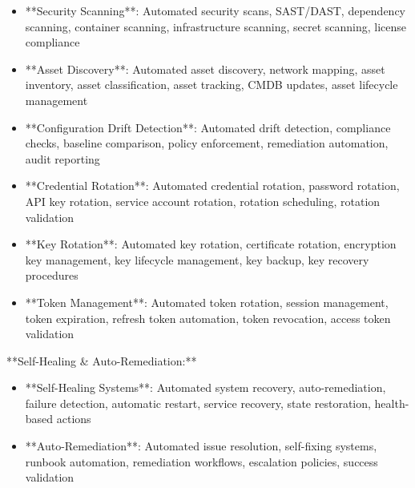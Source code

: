 \documentclass[11pt,a4paper]{article}
\begin{document}
\begin{itemize}
\item **Security Scanning**: Automated security scans, SAST/DAST, dependency scanning, container scanning, infrastructure scanning, secret scanning, license compliance
\end{itemize}

\begin{itemize}
\item **Asset Discovery**: Automated asset discovery, network mapping, asset inventory, asset classification, asset tracking, CMDB updates, asset lifecycle management
\end{itemize}

\begin{itemize}
\item **Configuration Drift Detection**: Automated drift detection, compliance checks, baseline comparison, policy enforcement, remediation automation, audit reporting
\end{itemize}

\begin{itemize}
\item **Credential Rotation**: Automated credential rotation, password rotation, API key rotation, service account rotation, rotation scheduling, rotation validation
\end{itemize}

\begin{itemize}
\item **Key Rotation**: Automated key rotation, certificate rotation, encryption key management, key lifecycle management, key backup, key recovery procedures
\end{itemize}

\begin{itemize}
\item **Token Management**: Automated token rotation, session management, token expiration, refresh token automation, token revocation, access token validation
\end{itemize}

**Self-Healing \& Auto-Remediation:**

\begin{itemize}
\item **Self-Healing Systems**: Automated system recovery, auto-remediation, failure detection, automatic restart, service recovery, state restoration, health-based actions
\end{itemize}

\begin{itemize}
\item **Auto-Remediation**: Automated issue resolution, self-fixing systems, runbook automation, remediation workflows, escalation policies, success validation
\end{itemize}
\end{document}
